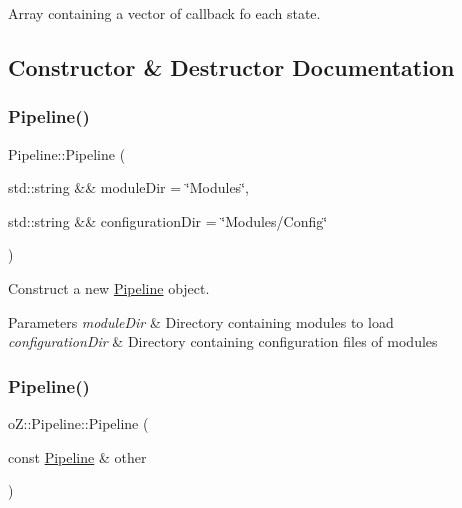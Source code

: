 Array containing a vector of callback fo each state. 



\subsection{Constructor \& Destructor Documentation}
\mbox{\label{classo_z_1_1_pipeline_a5fc2efefb6e953ce5a4f8d7d3437619a}} 
\subsubsection{\texorpdfstring{Pipeline()}{Pipeline()}\hspace{0.1cm}{\footnotesize\ttfamily [1/3]}}
{\footnotesize\ttfamily Pipeline\+::\+Pipeline (\begin{DoxyParamCaption}\item[{std\+::string \&\&}]{module\+Dir = {\ttfamily \char`\"{}Modules\char`\"{}},  }\item[{std\+::string \&\&}]{configuration\+Dir = {\ttfamily \char`\"{}Modules/Config\char`\"{}} }\end{DoxyParamCaption})}



Construct a new \mbox{\hyperlink{classo_z_1_1_pipeline}{Pipeline}} object. 


\begin{DoxyParams}{Parameters}
{\em module\+Dir} & Directory containing modules to load \\
\hline
{\em configuration\+Dir} & Directory containing configuration files of modules \\
\hline
\end{DoxyParams}
\mbox{\label{classo_z_1_1_pipeline_ab1d6cd9a6b71cae2b5ebe0031b945237}} 
\subsubsection{\texorpdfstring{Pipeline()}{Pipeline()}\hspace{0.1cm}{\footnotesize\ttfamily [2/3]}}
{\footnotesize\ttfamily o\+Z\+::\+Pipeline\+::\+Pipeline (\begin{DoxyParamCaption}\item[{const \mbox{\hyperlink{classo_z_1_1_pipeline}{Pipeline}} \&}]{other }\end{DoxyParamCaption})\hspace{0.3cm}{\ttfamily [delete]}}



